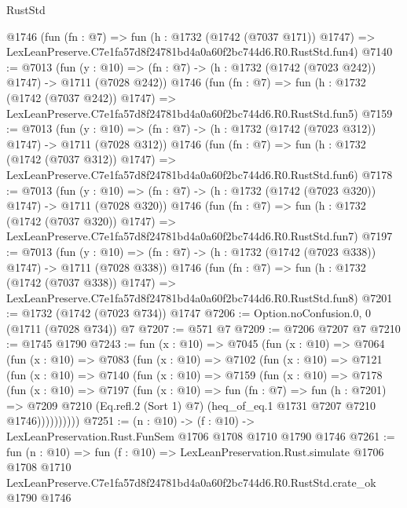 \begin{lexlean}{RustStd}
\begin{coremodule}
    @1746
    (fun (fn : @7) =>
    fun (h : @1732 (@1742 (@7037 @171)) @1747) =>
    LexLeanPreserve.C7e1fa57d8f24781bd4a0a60f2bc744d6.R0.RustStd.fun4)
@7140 := @7013
    (fun (y : @10) => (fn : @7) -> (h : @1732 (@1742 (@7023 @242)) @1747) -> @1711 (@7028 @242))
    @1746
    (fun (fn : @7) =>
    fun (h : @1732 (@1742 (@7037 @242)) @1747) =>
    LexLeanPreserve.C7e1fa57d8f24781bd4a0a60f2bc744d6.R0.RustStd.fun5)
@7159 := @7013
    (fun (y : @10) => (fn : @7) -> (h : @1732 (@1742 (@7023 @312)) @1747) -> @1711 (@7028 @312))
    @1746
    (fun (fn : @7) =>
    fun (h : @1732 (@1742 (@7037 @312)) @1747) =>
    LexLeanPreserve.C7e1fa57d8f24781bd4a0a60f2bc744d6.R0.RustStd.fun6)
@7178 := @7013
    (fun (y : @10) => (fn : @7) -> (h : @1732 (@1742 (@7023 @320)) @1747) -> @1711 (@7028 @320))
    @1746
    (fun (fn : @7) =>
    fun (h : @1732 (@1742 (@7037 @320)) @1747) =>
    LexLeanPreserve.C7e1fa57d8f24781bd4a0a60f2bc744d6.R0.RustStd.fun7)
@7197 := @7013
    (fun (y : @10) => (fn : @7) -> (h : @1732 (@1742 (@7023 @338)) @1747) -> @1711 (@7028 @338))
    @1746
    (fun (fn : @7) =>
    fun (h : @1732 (@1742 (@7037 @338)) @1747) =>
    LexLeanPreserve.C7e1fa57d8f24781bd4a0a60f2bc744d6.R0.RustStd.fun8)
@7201 := @1732 (@1742 (@7023 @734)) @1747
@7206 := Option.noConfusion.{0, 0} (@1711 (@7028 @734)) @7
@7207 := @571 @7
@7209 := @7206 @7207 @7
@7210 := @1745 @1790
@7243 := fun (x : @10) =>
  @7045
    (fun (x : @10) =>
    @7064
      (fun (x : @10) =>
      @7083
        (fun (x : @10) =>
        @7102
          (fun (x : @10) =>
          @7121
            (fun (x : @10) =>
            @7140
              (fun (x : @10) =>
              @7159
                (fun (x : @10) =>
                @7178
                  (fun (x : @10) =>
                  @7197
                    (fun (x : @10) =>
                    fun (fn : @7) =>
                    fun (h : @7201) =>
                    @7209
                      @7210
                      (Eq.refl.{2} (Sort 1) @7)
                      (heq_of_eq.{1} @1731 @7207 @7210 @1746))))))))))
@7251 := (n : @10) -> (f : @10) -> LexLeanPreservation.Rust.FunSem @1706 @1708 @1710 @1790 @1746
@7261 := fun (n : @10) =>
  fun (f : @10) =>
  LexLeanPreservation.Rust.simulate
    @1706
    @1708
    @1710
    LexLeanPreserve.C7e1fa57d8f24781bd4a0a60f2bc744d6.R0.RustStd.crate_ok
    @1790
    @1746
\end{coremodule}
\end{lexlean}
